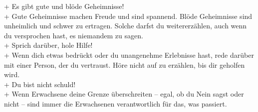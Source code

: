 + Es gibt gute und blöde Geheimnisse! \\[5pt]
+ Gute Geheimnisse machen Freude und sind spannend. Blöde Geheimnisse sind
\noindent\hspace*{2mm} unheimlich und schwer zu ertragen. Solche darfst du weitererzählen, auch wenn
\noindent\hspace*{2mm} du versprochen hast, es niemandem zu sagen. \\[5pt]
+ Sprich darüber, hole Hilfe! \\[5pt]
+ Wenn dich etwas bedrückt oder du unangenehme Erlebnisse hast, rede darüber
\noindent\hspace*{2mm} mit einer Person, der du vertraust. Höre nicht auf zu erzählen, bis dir geholfen wird. \\[5pt]
+ Du bist nicht schuld! \\[5pt]
+ Wenn Erwachsene deine Grenze überschreiten – egal, ob du Nein sagst oder nicht
\noindent\hspace*{2mm} – sind immer die Erwachsenen verantwortlich für das, was passiert.